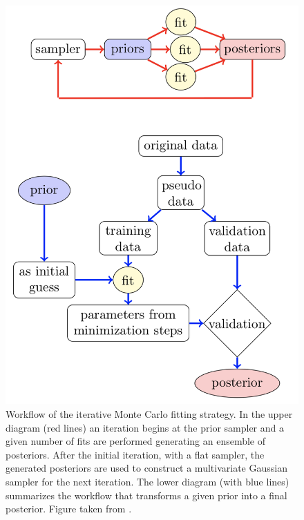 \begin{figure}[!h]
  \centering
	\includegraphics[scale=0.45]{./gfx/IMC.png}
	\caption{Workflow of the iterative Monte Carlo fitting strategy. In the upper diagram (red lines) an iteration begins at the prior sampler and a given number of fits are performed generating an ensemble of posteriors. After the initial iteration, with a flat sampler, the generated posteriors are used to construct a multivariate Gaussian sampler for the next iteration. The lower diagram (with blue lines) summarizes the workflow that transforms a given prior into a final posterior. Figure taken from \cite{IMC}.}
	\label{pic:IMC}
\end{figure}


